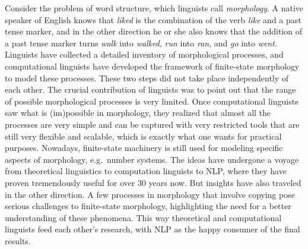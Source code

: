 Consider the problem of word structure, which linguists call \emph{morphology}.
A native speaker of English knows that \emph{liked} is the combination of the verb \emph{like} and a past tense marker, and in the other direction he or she also knows that the addition of a past tense marker turns \emph{walk} into \emph{walked}, \emph{run} into \emph{ran}, and \emph{go} into \emph{went}.
Linguists have collected a detailed inventory of morphological processes, and computational linguists have developed the framework of finite-state morphology to model these processes. 
These two steps did not take place independently of each other.
The crucial contribution of linguists was to point out that the range of possible morphological processes is very limited.
Once computational linguists saw what is (im)possible in morphology, they realized that almost all the processes are very simple and can be captured with very restricted tools that are still very flexible and scalable, which is exactly what one wants for practical purposes.
Nowadays, finite-state machinery is still used for modeling specific aspects of morphology, e.g.~number systems.
The ideas have undergone a voyage from theoretical linguistics to computation linguists to NLP, where they have proven tremendously useful for over 30 years now.
But insights have also traveled in the other direction.
A few processes in morphology that involve copying pose serious challenges to finite-state morphology, highlighting the need for a better understanding of these phenomena.
This way theoretical and computational linguists feed each other's research, with NLP as the happy consumer of the final results.

